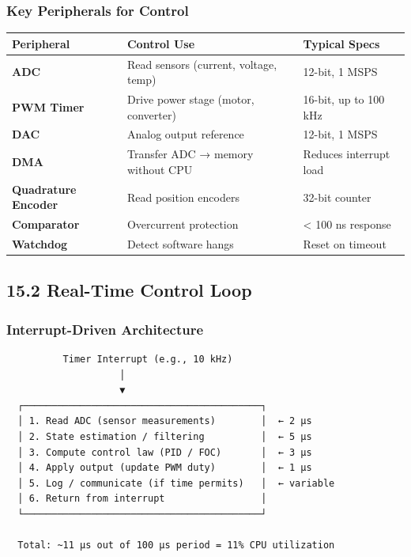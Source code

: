\documentclass[11pt,a4paper]{book}
\begin{document}
\begin{itemize}
\subsubsection{Key Peripherals for Control}

\begin{center}
\begin{tabular}{|l|l|l|}
\hline
Peripheral & Control Use & Typical Specs \\
\hline
\textbf{ADC} & Read sensors (current, voltage, temp) & 12-bit, 1 MSPS \\
\textbf{PWM Timer} & Drive power stage (motor, converter) & 16-bit, up to 100 kHz \\
\textbf{DAC} & Analog output reference & 12-bit, 1 MSPS \\
\textbf{DMA} & Transfer ADC → memory without CPU & Reduces interrupt load \\
\textbf{Quadrature Encoder} & Read position encoders & 32-bit counter \\
\textbf{Comparator} & Overcurrent protection & < 100 ns response \\
\textbf{Watchdog} & Detect software hangs & Reset on timeout \\
\hline
\end{tabular}
\end{center}

\medskip\noindent\hrulefill\medskip

\subsection{15.2 Real-Time Control Loop}

\subsubsection{Interrupt-Driven Architecture}

\begin{lstlisting}
          Timer Interrupt (e.g., 10 kHz)
                    │
                    ▼
  ┌──────────────────────────────────────────┐
  │ 1. Read ADC (sensor measurements)        │  ← 2 µs
  │ 2. State estimation / filtering          │  ← 5 µs
  │ 3. Compute control law (PID / FOC)       │  ← 3 µs
  │ 4. Apply output (update PWM duty)        │  ← 1 µs
  │ 5. Log / communicate (if time permits)   │  ← variable
  │ 6. Return from interrupt                 │
  └──────────────────────────────────────────┘
  
  Total: ~11 µs out of 100 µs period = 11% CPU utilization
  

\end{lstlisting}
\end{itemize}
\end{document}
